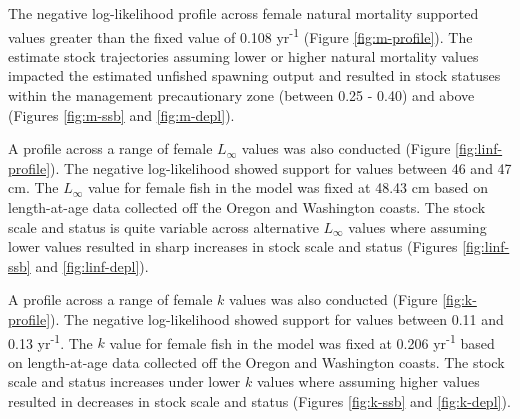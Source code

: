 \documentclass[11pt,
  english,
  a4paper,
]{article}
\begin{document}
\leavevmode\tagmcend\tagstructend\par


The negative log-likelihood profile across female natural mortality supported values greater than the fixed value of 0.108 yr\textsuperscript{-1} (Figure \ref{fig:m-profile}). The estimate stock trajectories assuming lower or higher natural mortality values impacted the estimated unfished spawning output and resulted in stock statuses within the management precautionary zone (between 0.25 - 0.40) and above (Figures \ref{fig:m-ssb} and \ref{fig:m-depl}).

\leavevmode\tagmcend\tagstructend\par


A profile across a range of female {\(L_{\infty}\)\leavevmode\tagmcend\tagstructend} values was also conducted (Figure \ref{fig:linf-profile}). The negative log-likelihood showed support for values between 46 and 47 cm. The {\(L_{\infty}\)\leavevmode\tagmcend\tagstructend} value for female fish in the model was fixed at 48.43 cm based on length-at-age data collected off the Oregon and Washington coasts. The stock scale and status is quite variable across alternative {\(L_{\infty}\)\leavevmode\tagmcend\tagstructend} values where assuming lower values resulted in sharp increases in stock scale and status (Figures \ref{fig:linf-ssb} and \ref{fig:linf-depl}).

\leavevmode\tagmcend\tagstructend\par


A profile across a range of female {\(k\)\leavevmode\tagmcend\tagstructend} values was also conducted (Figure \ref{fig:k-profile}). The negative log-likelihood showed support for values between 0.11 and 0.13 yr\textsuperscript{-1}. The {\(k\)\leavevmode\tagmcend\tagstructend} value for female fish in the model was fixed at 0.206 yr\textsuperscript{-1} based on length-at-age data collected off the Oregon and Washington coasts. The stock scale and status increases under lower {\(k\)\leavevmode\tagmcend\tagstructend} values where assuming higher values resulted in decreases in stock scale and status (Figures \ref{fig:k-ssb} and \ref{fig:k-depl}).
\end{document}

